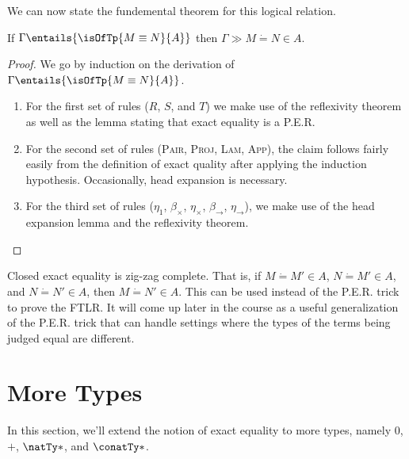 \documentclass[letterpaper]{article}
\begin{document}
We can now state the fundemental theorem for this logical relation.

\begin{theorem}[FTLR]
If $\Gamma \entails{\isOfTp{M \equiv N}{A}}$ then $\Gamma \gg M \dot{=} N \in A$.
\end{theorem}
\begin{proof}
We go by induction on the derivation of $\Gamma \entails{\isOfTp{M \equiv N}{A}}$. 
\begin{enumerate}
  \item For the first set of rules ($R$, $S$, and $T$) we make use of the reflexivity theorem as well as the lemma stating that exact equality is a P.E.R.
  \item For the second set of rules (\textsc{Pair}, \textsc{Proj}, \textsc{Lam}, \textsc{App}), the claim follows fairly easily from the definition of exact quality after applying the induction hypothesis. Occasionally, head expansion is necessary.
  \item For the third set of rules ($\eta_1$, $\beta_\times$, $\eta_\times$, $\beta_\to$, $\eta_\to$), we make use of the head expansion lemma and the reflexivity theorem.
\end{enumerate}
\end{proof}

\begin{remark}

Closed exact equality is zig-zag complete. That is, if $M \dot{=} M' \in A$, $N \dot{=} M' \in A$, and $N \dot{=} N' \in A$, then $M \dot{=} N' \in A$. This can be used instead of the P.E.R. trick to prove the FTLR. It will come up later in the course as a useful generalization of the P.E.R. trick that can handle settings where the types of the terms being judged equal are different.

\end{remark}


\section{More Types}

In this section, we'll extend the notion of exact equality to more types, namely $0$, $+$, $\natTy*$, and $\conatTy*$.
\end{document}
